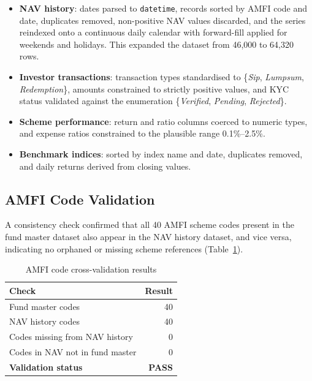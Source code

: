 \documentclass[10pt,twocolumn]{article}
\begin{document}
\begin{itemize}[leftmargin=*, itemsep=1pt]
\item \textbf{NAV history}: dates parsed to \texttt{datetime}, records sorted
  by AMFI code and date, duplicates removed, non-positive NAV values
  discarded, and the series reindexed onto a continuous daily calendar with
  forward-fill applied for weekends and holidays. This expanded the dataset
  from 46{,}000 to 64{,}320 rows.
\item \textbf{Investor transactions}: transaction types standardised to
  \{\textit{Sip}, \textit{Lumpsum}, \textit{Redemption}\}, amounts
  constrained to strictly positive values, and KYC status validated against
  the enumeration \{\textit{Verified}, \textit{Pending}, \textit{Rejected}\}.
\item \textbf{Scheme performance}: return and ratio columns coerced to
  numeric types, and expense ratios constrained to the plausible range
  0.1\%--2.5\%.
\item \textbf{Benchmark indices}: sorted by index name and date, duplicates
  removed, and daily returns derived from closing values.
\end{itemize}

\subsection{AMFI Code Validation}
A consistency check confirmed that all 40 AMFI scheme codes present in the
fund master dataset also appear in the NAV history dataset, and vice versa,
indicating no orphaned or missing scheme references
(Table~\ref{tab:validation}).

\begin{table}[h]
\centering
\small
\caption{AMFI code cross-validation results}
\label{tab:validation}
\begin{tabular}{@{}lr@{}}
\toprule
\textbf{Check} & \textbf{Result} \\
\midrule
Fund master codes                  & 40 \\
NAV history codes                  & 40 \\
Codes missing from NAV history     & 0 \\
Codes in NAV not in fund master    & 0 \\
\textbf{Validation status}         & \textbf{PASS} \\
\bottomrule
\end{tabular}
\end{table}
\end{document}
